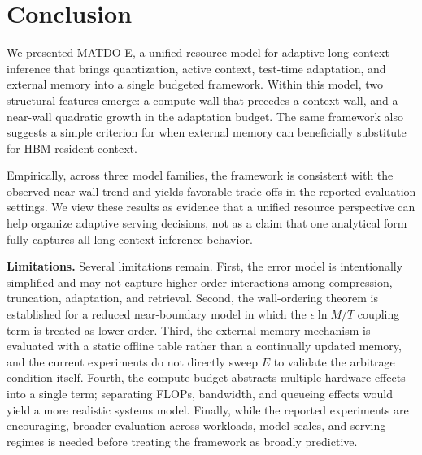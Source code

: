 \documentclass[11pt,a4paper]{article}
\theoremstyle{plain}
\theoremstyle{definition}
\begin{document}
\section{Conclusion}
\label{sec:conclusion}

We presented MATDO-E, a unified resource model for adaptive long-context inference that brings quantization, active context, test-time adaptation, and external memory into a single budgeted framework. Within this model, two structural features emerge: a compute wall that precedes a context wall, and a near-wall quadratic growth in the adaptation budget. The same framework also suggests a simple criterion for when external memory can beneficially substitute for HBM-resident context.

Empirically, across three model families, the framework is consistent with the observed near-wall trend and yields favorable trade-offs in the reported evaluation settings. We view these results as evidence that a unified resource perspective can help organize adaptive serving decisions, not as a claim that one analytical form fully captures all long-context inference behavior.

\textbf{Limitations.} Several limitations remain. First, the error model is intentionally simplified and may not capture higher-order interactions among compression, truncation, adaptation, and retrieval. Second, the wall-ordering theorem is established for a reduced near-boundary model in which the $\epsilon \ln M / T$ coupling term is treated as lower-order. Third, the external-memory mechanism is evaluated with a static offline table rather than a continually updated memory, and the current experiments do not directly sweep $E$ to validate the arbitrage condition itself. Fourth, the compute budget abstracts multiple hardware effects into a single term; separating FLOPs, bandwidth, and queueing effects would yield a more realistic systems model. Finally, while the reported experiments are encouraging, broader evaluation across workloads, model scales, and serving regimes is needed before treating the framework as broadly predictive.
\end{document}
